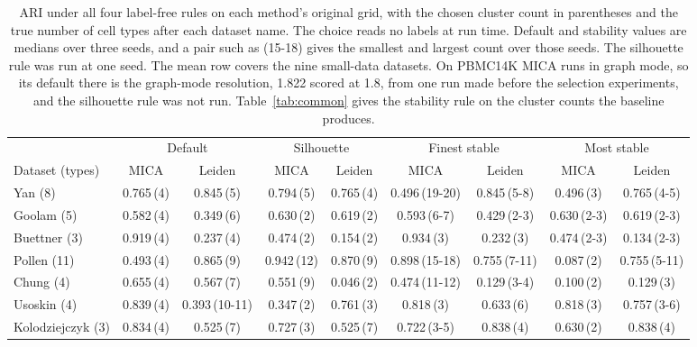 \begin{table}[t]
\centering
\caption{ARI under all four label-free rules on each method's original grid, with the chosen cluster count in parentheses and the true number of cell types after each dataset name. The choice reads no labels at run time. Default and stability values are medians over three seeds, and a pair such as (15-18) gives the smallest and largest count over those seeds. The silhouette rule was run at one seed. The mean row covers the nine small-data datasets. On PBMC14K MICA runs in graph mode, so its default there is the graph-mode resolution, 1.822 scored at 1.8, from one run made before the selection experiments, and the silhouette rule was not run. Table~\ref{tab:common} gives the stability rule on the cluster counts the baseline produces.}
\label{tab:rulesall}
\footnotesize
\setlength{\tabcolsep}{4pt}
\begin{tabular}{lcccccccc}
\toprule
 & \multicolumn{2}{c}{Default} & \multicolumn{2}{c}{Silhouette} & \multicolumn{2}{c}{Finest stable} & \multicolumn{2}{c}{Most stable} \\
\cmidrule(lr){2-3}\cmidrule(lr){4-5}\cmidrule(lr){6-7}\cmidrule(lr){8-9}
Dataset (types) & MICA & Leiden & MICA & Leiden & MICA & Leiden & MICA & Leiden \\
\midrule
Yan (8) & 0.765\,(4) & 0.845\,(5) & 0.794\,(5) & 0.765\,(4) & 0.496\,(19\textrm{-}20) & 0.845\,(5\textrm{-}8) & 0.496\,(3) & 0.765\,(4\textrm{-}5) \\
Goolam (5) & 0.582\,(4) & 0.349\,(6) & 0.630\,(2) & 0.619\,(2) & 0.593\,(6\textrm{-}7) & 0.429\,(2\textrm{-}3) & 0.630\,(2\textrm{-}3) & 0.619\,(2\textrm{-}3) \\
Buettner (3) & 0.919\,(4) & 0.237\,(4) & 0.474\,(2) & 0.154\,(2) & 0.934\,(3) & 0.232\,(3) & 0.474\,(2\textrm{-}3) & 0.134\,(2\textrm{-}3) \\
Pollen (11) & 0.493\,(4) & 0.865\,(9) & 0.942\,(12) & 0.870\,(9) & 0.898\,(15\textrm{-}18) & 0.755\,(7\textrm{-}11) & 0.087\,(2) & 0.755\,(5\textrm{-}11) \\
Chung (4) & 0.655\,(4) & 0.567\,(7) & 0.551\,(9) & 0.046\,(2) & 0.474\,(11\textrm{-}12) & 0.129\,(3\textrm{-}4) & 0.100\,(2) & 0.129\,(3) \\
Usoskin (4) & 0.839\,(4) & 0.393\,(10\textrm{-}11) & 0.347\,(2) & 0.761\,(3) & 0.818\,(3) & 0.633\,(6) & 0.818\,(3) & 0.757\,(3\textrm{-}6) \\
Kolodziejczyk (3) & 0.834\,(4) & 0.525\,(7) & 0.727\,(3) & 0.525\,(7) & 0.722\,(3\textrm{-}5) & 0.838\,(4) & 0.630\,(2) & 0.838\,(4) \\

\end{tabular}
\end{table}
